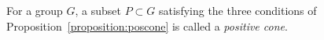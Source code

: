 \begin{definition} For a group $G$, a subset $P\subset{}G$ satisfying the three conditions of Proposition~\ref{proposition:poscone} is called a {\it positive cone}.
\end{definition}


%




